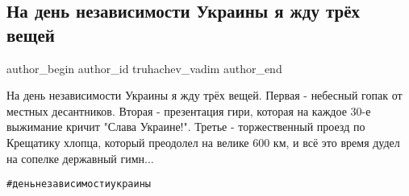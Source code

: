 
 
 
 
 
 
\subsection{На день независимости Украины я жду трёх вещей}
\label{sec:24_08_2021.fb.truhachev_vadim.1.den_nezavisimost_tri_veschi}
 
\ifcmt
 author_begin
   author_id truhachev_vadim
 author_end
\fi

На день независимости Украины я жду трёх вещей. Первая -  небесный гопак от
местных десантников. Вторая - презентация гири, которая на каждое 30-е
выжимание кричит "Слава Украине!". Третье - торжественный проезд по Крещатику
хлопца, который преодолел на велике 600 км, и всё это время дудел на сопелке
державный гимн... 

\verb|#деньнезависимостиукраины|

